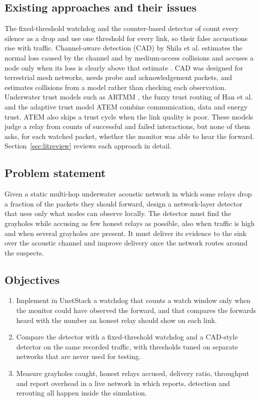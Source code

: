 \documentclass{article}
\begin{document}
\subsection{Existing approaches and their issues}\label{sec:existing}
\noindent
The fixed-threshold watchdog \cite{marti2000} and the counter-based detector of \cite{brc2021} count every silence as a drop and use one threshold for every link, so their false accusations rise with traffic. Channel-aware detection (CAD) by Shila et al. estimates the normal loss caused by the channel and by medium-access collisions and accuses a node only when its loss is clearly above that estimate \cite{shila2010}. CAD was designed for terrestrial mesh networks, needs probe and acknowledgement packets, and estimates collisions from a model rather than checking each observation. Underwater trust models such as ARTMM \cite{han2015}, the fuzzy trust routing of Han et al. \cite{han2023} and the adaptive trust model ATEM \cite{liu2024} combine communication, data and energy trust. ATEM also skips a trust cycle when the link quality is poor. These models judge a relay from counts of successful and failed interactions, but none of them asks, for each watched packet, whether the monitor was able to hear the forward. Section~\ref{sec:litreview} reviews each approach in detail.

\subsection{Problem statement}\label{sec:problem}
\noindent
Given a static multi-hop underwater acoustic network in which some relays drop a fraction of the packets they should forward, design a network-layer detector that uses only what nodes can observe locally. The detector must find the grayholes while accusing as few honest relays as possible, also when traffic is high and when several grayholes are present. It must deliver its evidence to the sink over the acoustic channel and improve delivery once the network routes around the suspects.

\subsection{Objectives}\label{sec:objectives}
\begin{enumerate}
  \item Implement in UnetStack a watchdog that counts a watch window only when the monitor could have observed the forward, and that compares the forwards heard with the number an honest relay should show on each link.
  \item Compare the detector with a fixed-threshold watchdog and a CAD-style detector on the same recorded traffic, with thresholds tuned on separate networks that are never used for testing.
  \item Measure grayholes caught, honest relays accused, delivery ratio, throughput and report overhead in a live network in which reports, detection and rerouting all happen inside the simulation.
\end{enumerate}
\end{document}
